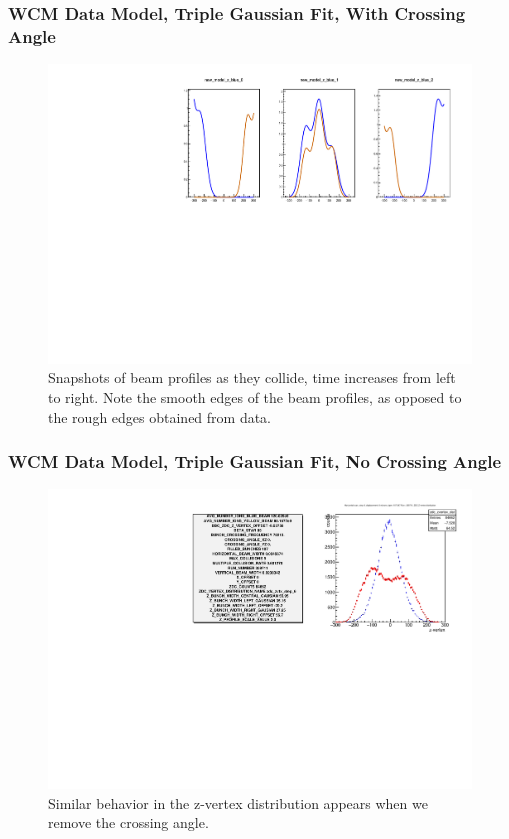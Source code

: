 \begin{frame}
\frametitle{WCM Data Model, Triple Gaussian Fit, With Crossing Angle}
\begin{figure}
\begin{center}
\includegraphics[width=\linewidth]{../OverlapTest/figs/359711_model2_angle_zprofile.pdf}
\end{center}
\caption{Snapshots of beam profiles as they collide, time increases from left to
right. Note the smooth edges of the beam profiles, as opposed to the rough
edges obtained from data. }
\label{fig:359711_model2_angle_zprofile}
\end{figure}
\end{frame}


\begin{frame}
\frametitle{WCM Data Model, Triple Gaussian Fit, No Crossing Angle}
\begin{figure}
\begin{center}
\includegraphics[width=\linewidth]{../OverlapTest/figs/359711_model2_noangle_vertex.pdf}
\end{center}
\caption{Similar behavior in the z-vertex distribution appears when we remove
the crossing angle.}
\label{fig:359711_model2_noangle_vertex}
\end{figure}
\end{frame}


